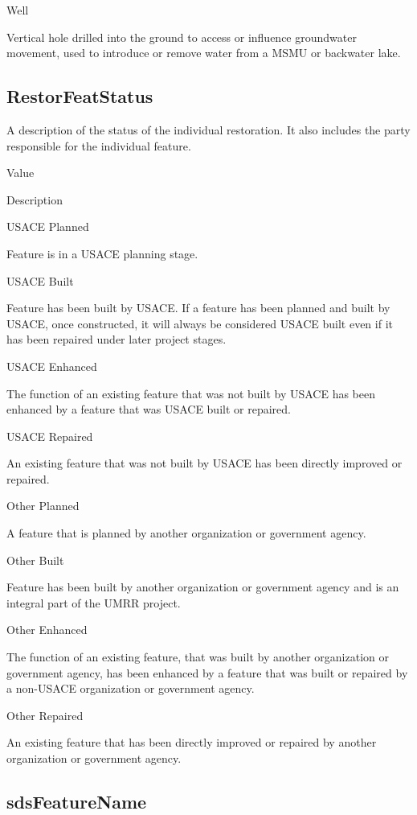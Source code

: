 \documentclass[
  letterpaper,
  DIV=11,
  numbers=noendperiod]{scrreprt}
\begin{document}
Well

Vertical hole drilled into the ground to access or influence groundwater
movement, used to introduce or remove water from a MSMU or backwater
lake.

\subsection{RestorFeatStatus}\label{restorfeatstatus-15}

A description of the status of the individual restoration. It also
includes the party responsible for the individual feature.

Value

Description

USACE Planned

Feature is in a USACE planning stage.

USACE Built

Feature has been built by USACE. If a feature has been planned and built
by USACE, once constructed, it will always be considered USACE built
even if it has been repaired under later project stages.

USACE Enhanced

The function of an existing feature that was not built by USACE has been
enhanced by a feature that was USACE built or repaired.

USACE Repaired

An existing feature that was not built by USACE has been directly
improved or repaired.

Other Planned

A feature that is planned by another organization or government agency.

Other Built

Feature has been built by another organization or government agency and
is an integral part of the UMRR project.

Other Enhanced

The function of an existing feature, that was built by another
organization or government agency, has been enhanced by a feature that
was built or repaired by a non-USACE organization or government agency.

Other Repaired

An existing feature that has been directly improved or repaired by
another organization or government agency.

\subsection{sdsFeatureName}\label{sdsfeaturename-15}
\end{document}
